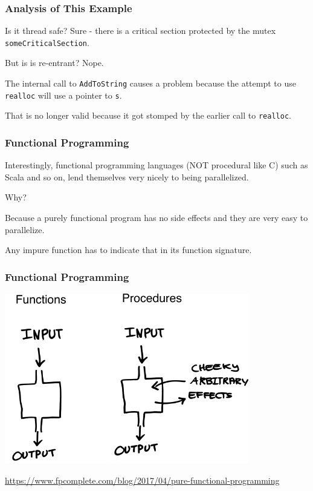 \begin{frame}
\frametitle{Analysis of This Example}

Is it thread safe? Sure - there is a critical section protected by the mutex \texttt{someCriticalSection}. 

But is is re-entrant? Nope. 

The internal call to \texttt{AddToString} causes a problem because the attempt to use \texttt{realloc} will use a pointer to \texttt{s}.

That is no longer valid because it got stomped by the earlier call to \texttt{realloc}.


\end{frame}



\begin{frame}
\frametitle{Functional Programming}

Interestingly, functional programming languages (NOT procedural like C) such as Scala and so on, lend themselves very nicely to being parallelized. 

Why? 

Because a purely functional program has no side effects and they are very easy to parallelize.

Any impure function has to indicate that in its function signature.

\end{frame}



\begin{frame}
\frametitle{Functional Programming}

\begin{center}
	\includegraphics[width=0.8\textwidth]{images/functional.png}
\end{center}
{\small \url{https://www.fpcomplete.com/blog/2017/04/pure-functional-programming}}


\end{frame}



